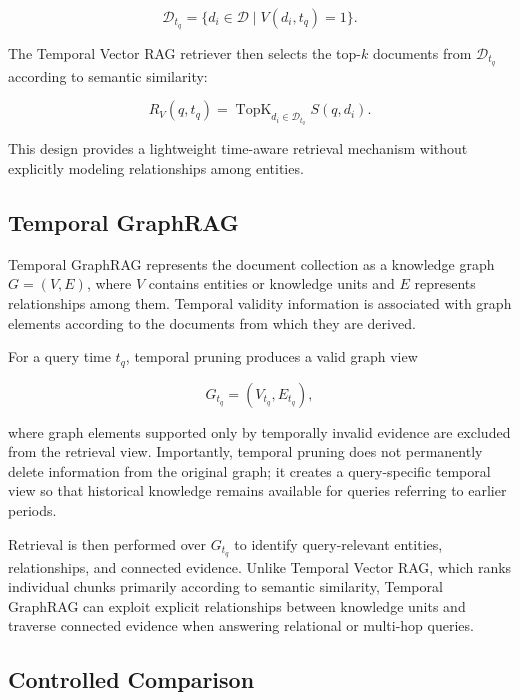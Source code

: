 \documentclass[conference]{IEEEtran}
\numberwithin{equation}{section}
\begin{document}
\begin{equation}
\mathcal{D}_{t_q}=\{d_i \in \mathcal{D} \mid V(d_i,t_q)=1\}.
\label{eq:temporal_documents}
\end{equation}

The Temporal Vector RAG retriever then selects the top-$k$ documents from $\mathcal{D}_{t_q}$ according to semantic similarity:

\begin{equation}
R_V(q,t_q)=\operatorname{TopK}_{d_i \in \mathcal{D}_{t_q}} S(q,d_i).
\label{eq:temporal_vector}
\end{equation}

This design provides a lightweight time-aware retrieval mechanism without explicitly modeling relationships among entities.

\subsection{Temporal GraphRAG}

Temporal GraphRAG represents the document collection as a knowledge graph $G=(V,E)$, where $V$ contains entities or knowledge units and $E$ represents relationships among them. Temporal validity information is associated with graph elements according to the documents from which they are derived.

For a query time $t_q$, temporal pruning produces a valid graph view

\begin{equation}
G_{t_q}=(V_{t_q},E_{t_q}),
\label{eq:temporal_graph}
\end{equation}

where graph elements supported only by temporally invalid evidence are excluded from the retrieval view. Importantly, temporal pruning does not permanently delete information from the original graph; it creates a query-specific temporal view so that historical knowledge remains available for queries referring to earlier periods.

Retrieval is then performed over $G_{t_q}$ to identify query-relevant entities, relationships, and connected evidence. Unlike Temporal Vector RAG, which ranks individual chunks primarily according to semantic similarity, Temporal GraphRAG can exploit explicit relationships between knowledge units and traverse connected evidence when answering relational or multi-hop queries.

\subsection{Controlled Comparison}
\end{document}
